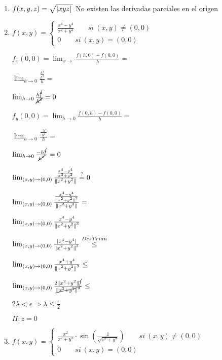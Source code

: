 \documentclass[../practica_04.tex]{subfiles}
\begin{document}
    \begin{enumerate}
        \item $f(x,y,z) = \sqrt{\abs*{xyz}}$
            No existen las derivadas parciales en el origen

        \item $f(x,y) = 
            \left\{
                \begin{array}{ll}
                    \frac{x^4-y^4}{x^2+y^2} \qquad si\ (x,y) \neq (0,0)\\
                    0 \qquad si\ (x,y) = (0,0)
                \end{array}
            \right.$

            $f_x(0,0) = \lim_{x\to} \frac{f(h,0)-f(0,0)}{h} = $

            $\lim_{h\to0} \frac{\frac{h^4}{h^2}}{h} = $

            $\lim_{h\to0} \frac{h\cancel{^4}}{\cancel{h^3}} = 0 $

            $f_y(0,0) = \lim_{h\to0} \frac{f(0,h)-f(0,0)}{h} = $

            $\lim_{h\to0} \frac{\frac{-h^4}{h^2}}{h} = $

            $\lim_{h\to0} \frac{-h\cancel{^4}}{\cancel{h^3}} = 0 $

            $\lim_{(x,y)\to(0,0)} \frac{\frac{x^4-y^4}{x^2+y^2}}{\norm*{x^2+y^2}} \stackrel{?}{=} 0 $

            $\lim_{(x,y)\to(0,0)} \frac{\frac{x^4-y^4}{\norm*{x^2+y^2}^2}}{\norm*{x^2+y^2}} = $

            $\lim_{(x,y)\to(0,0)} \frac{x^4-y^4}{\norm*{x^2+y^2}^3}  $

            $\lim_{(x,y)\to(0,0)} \frac{\abs*{x^4-y^4}}{\norm*{x^2+y^2}^3} \stackrel{DesTrian}{\leq} $

            $\lim_{(x,y)\to(0,0)} \frac{x^4+y^4}{\norm*{x^2+y^2}^3} \leq $

            $\lim_{(x,y)\to(0,0)} \frac{2\norm*{x^2+y^2}\cancel{^4}}{\cancel{\norm*{x^2+y^2}^3}} \leq $

            $ 2 \lambda < \epsilon \Rightarrow \lambda \leq \frac{\epsilon}{2}$

            $\Pi: z = 0$

        \item $f(x,y) = 
            \left\{
                \begin{array}{ll}
                    \frac{x^2}{x^2+y^2}\cdot \sin(\frac{1}{\sqrt{x^2+y^2}}) \qquad si\ (x,y) \neq (0,0)\\
                    0 \qquad si\ (x,y) = (0,0)
                \end{array}
            \right.$


\end{enumerate}
\end{document}
